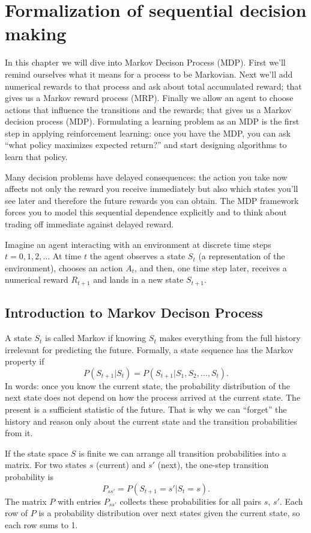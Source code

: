 \chapter{Formalization of sequential decision making}
In this chapter we will dive into Markov Decison Process (MDP). First we’ll remind ourselves what it means for a process to be Markovian. Next we’ll add numerical rewards to that process and ask about total accumulated reward; that gives us a Markov reward process (MRP). Finally we allow an agent to choose actions that influence the transitions and the rewards; that gives us a Markov decision process (MDP). Formulating a learning problem as an MDP is the first step in applying reinforcement learning: once you have the MDP, you can ask “what policy maximizes expected return?” and start designing algorithms to learn that policy.

Many decision problems have delayed consequences: the action you take now affects not only the reward you receive immediately but also which states you’ll see later and therefore the future rewards you can obtain. The MDP framework forces you to model this sequential dependence explicitly and to think about trading off immediate against delayed reward.

Imagine an agent interacting with an environment at discrete time steps $t=0,1,2,\ldots$ At time $t$ the agent observes a state $S_t$ (a representation of the environment), chooses an action $A_t$, and then, one time step later, receives a numerical reward $R_{t+1}$ and lands in a new state $S_{t+1}$.

\section{Introduction to Markov Decison Process}
A state $S_t$ is called Markov if knowing $S_t$ makes everything from the full history irrelevant for predicting the future. Formally, a state sequence has the Markov property if
\begin{equation*}
    P(S_{t+1}|S_t) = P(S_{t+1}|S_1, S_2, \ldots, S_t).
\end{equation*}
In words: once you know the current state, the probability distribution of the next state does not depend on how the process arrived at the current state. The present is a sufficient statistic of the future. That is why we can “forget” the history and reason only about the current state and the transition probabilities from it.

If the state space $S$ is finite we can arrange all transition probabilities into a matrix. For two states $s$ (current) and $s'$ (next), the one-step transition probability is
\begin{equation*}
    P_{ss'} = P(S_{t+1}=s'|S_t=s).
\end{equation*}
The matrix $P$ with entries $P_{ss'}$ collects these probabilities for all pairs $s$, $s'$. Each row of $P$ is a probability distribution over next states given the current state, so each row sums to 1.

